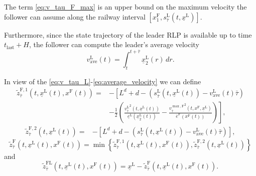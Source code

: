 The term \eqref{eq:v_tau_F_max} is an upper bound on the maximum velocity the follower can assume along the railway interval $\left[x_1^\mathrm{F} ,s_{\bar{\tau}}^\mathrm{L}\left(t,\underline{x}^\mathrm{L}\right)\right]$.

Furthermore, since the state trajectory of the leader RLP is available up to time $t_{\mathrm{last}}+H$, the follower can compute the leader's average velocity
\begin{equation}\label{eq:average_velocity}
	v_{\mathrm{ave}}^\mathrm{L}(t)=\int_{t}^{t+\bar{\tau}} \underline{x}_2^\mathrm{L}(r)\, dr.
\end{equation} 


In view of the \eqref{eq:v_tau_L}\--\eqref{eq:average_velocity} we can define 
\begin{equation*}\label{eq:z_tilde_prime}
	\begin{aligned}
		\tilde{z}^{\mathrm{F},1}_{\bar{\tau}} (t,\underline{x}^\mathrm{L}(t),x^\mathrm{F}(t))=& -\left[L^d +d -\left(s_{\bar{\tau}}^\mathrm{L}(t,\underline{x}^\mathrm{L}(t))-v_{\mathrm{ave}}^\mathrm{L}(t)\bar{\tau}\right)\right. \\
		& \left. -\frac{1}{2}\left(\frac{{v_{\bar{\tau}}^\mathrm{L}}^2(t,\underline{x}^\mathrm{L}(t))}{\underline{e}^\mathrm{L}(\underline{x}_2^\mathrm{L}(t))}-\frac{{v_{\bar{\tau}}^{\max, \mathrm{F}}}^2\left( t,x^\mathrm{F},\underline{x}^\mathrm{L} \right)}{\overline{e}^\mathrm{F}(x^\mathrm{F}(t))}\right)\right],
	\end{aligned}
\end{equation*}
\begin{equation*}\label{eq:z_tilde_second}
	\begin{aligned}
		\tilde{z}^{\mathrm{F},2}_{\bar{\tau}} (t,\underline{x}^\mathrm{L}(t))=& -\left[L^d +d -\left(s_{\bar{\tau}}^\mathrm{L}(t,\underline{x}^\mathrm{L}(t))-v_{\mathrm{ave}}^\mathrm{L}(t)\bar{\tau}\right)\right],
	\end{aligned}
\end{equation*}
\begin{equation}\label{eq:z_tilde}
	\tilde{z}^{\mathrm{F}}_{\bar{\tau}} (t,\underline{x}^\mathrm{L}(t),x^\mathrm{F}(t)) = \min \left\{ \tilde{z}^{\mathrm{F},1}_{\bar{\tau}} (t,\underline{x}^\mathrm{L}(t),x^\mathrm{F}(t)), \tilde{z}^{\mathrm{F},2}_{\bar{\tau}} (t,\underline{x}^\mathrm{L}(t)) \right\}
\end{equation}
and
\begin{equation}\label{eq:z_tilde_LF_tau}
	\tilde{z}^{\mathrm{FL}}_{\bar{\tau}} (t,\underline{x}^\mathrm{L}(t),x^\mathrm{F}(t))=\underline{x}^\mathrm{L}-\tilde{z}^{\mathrm{F}}_{\bar{\tau}} (t,\underline{x}^\mathrm{L}(t),x^\mathrm{F}(t)). 
\end{equation} 

